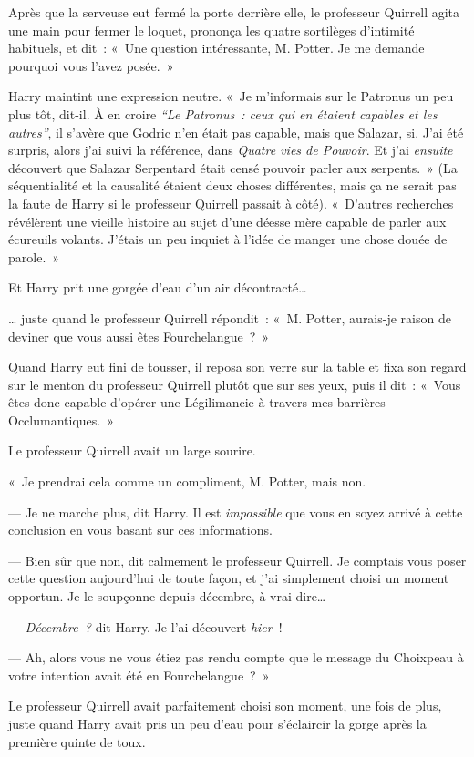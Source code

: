 Après que la serveuse eut fermé la porte derrière elle, le professeur Quirrell agita une main pour fermer le loquet, prononça les quatre sortilèges d'intimité habituels, et dit~: «~Une question intéressante, M. Potter. Je me demande pourquoi vous l'avez posée.~»

Harry maintint une expression neutre. «~Je m'informais sur le Patronus un peu plus tôt, dit-il. À en croire \emph{“Le Patronus~: ceux qui en étaient capables et les autres”}, il s'avère que Godric n'en était pas capable, mais que Salazar, si. J'ai été surpris, alors j'ai suivi la référence, dans \emph{Quatre vies de Pouvoir}. Et j'ai \emph{ensuite} découvert que Salazar Serpentard était censé pouvoir parler aux serpents.~» (La séquentialité et la causalité étaient deux choses différentes, mais ça ne serait pas la faute de Harry si le professeur Quirrell passait à côté). «~D'autres recherches révélèrent une vieille histoire au sujet d'une déesse mère capable de parler aux écureuils volants. J'étais un peu inquiet à l'idée de manger une chose douée de parole.~»

Et Harry prit une gorgée d'eau d'un air décontracté…

… juste quand le professeur Quirrell répondit~: «~M. Potter, aurais-je raison de deviner que vous aussi êtes Fourchelangue~?~»

Quand Harry eut fini de tousser, il reposa son verre sur la table et fixa son regard sur le menton du professeur Quirrell plutôt que sur ses yeux, puis il dit~: «~Vous êtes donc capable d'opérer une Légilimancie à travers mes barrières Occlumantiques.~»

Le professeur Quirrell avait un large sourire.

«~Je prendrai cela comme un compliment, M. Potter, mais non.

--- Je ne marche plus, dit Harry. Il est \emph{impossible} que vous en soyez arrivé à cette conclusion en vous basant sur ces informations.

--- Bien sûr que non, dit calmement le professeur Quirrell. Je comptais vous poser cette question aujourd'hui de toute façon, et j'ai simplement choisi un moment opportun. Je le soupçonne depuis décembre, à vrai dire…

--- \emph{Décembre~?} dit Harry. Je l'ai découvert \emph{hier}~!

--- Ah, alors vous ne vous étiez pas rendu compte que le message du Choixpeau à votre intention avait été en Fourchelangue~?~»

Le professeur Quirrell avait parfaitement choisi son moment, une fois de plus, juste quand Harry avait pris un peu d'eau pour s'éclaircir la gorge après la première quinte de toux.


